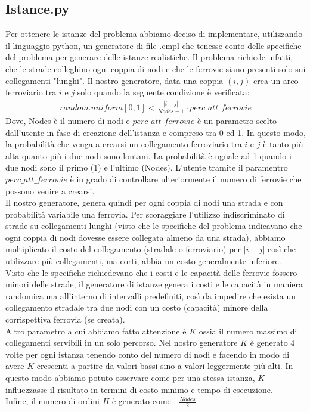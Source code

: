 \documentclass{article}
\begin{document}
\subsection{Istance.py}
Per ottenere le istanze del problema abbiamo deciso di implementare, utilizzando il linguaggio python, un generatore di file .cmpl che tenesse conto delle specifiche del problema per generare delle istanze realistiche. Il problema richiede infatti, che le strade colleghino ogni coppia di nodi e che le ferrovie siano presenti solo sui collegamenti "lunghi". Il nostro generatore, data una coppia $(i,j)$ crea un arco ferroviario tra $i$ e $j$ solo quando la seguente condizione è verificata:
\begin{align}
random.uniform[0,1] < \frac{|i -j|}{Nodes-1}\cdot perc\_att\_ferrovie
\end{align}
Dove, Nodes è il numero di nodi e $perc\_att\_ferrovie$ è un parametro scelto dall'utente in fase di creazione dell'istanza e compreso tra 0 ed 1. In questo modo, la probabilità che venga a crearsi un collegamento ferroviario tra $i$ e $j$ è tanto più alta quanto più i due nodi sono lontani. La probabilità è uguale ad 1 quando i due nodi sono il primo (1) e l'ultimo (Nodes). L'utente tramite il paramentro $perc\_att\_ferrovie$ è in grado di controllare ulteriormente il numero di ferrovie che possono venire a crearsi. 
\\
Il nostro generatore, genera quindi per ogni coppia di nodi una strada e con probabilità variabile una ferrovia. Per scoraggiare l'utilizzo indiscriminato di strade su collegamenti lunghi (visto che le specifiche del problema indicavano che ogni coppia di nodi dovesse essere collegata almeno da una strada), abbiamo moltiplicato il costo del collegamento (stradale o ferroviario) per $|i-j|$ così che utilizzare più collegamenti, ma corti, abbia un costo generalmente inferiore.
\\
Visto che le specifiche richiedevano che i costi e le capacità delle ferrovie fossero minori delle strade, il generatore di istanze genera i costi e le capacità in maniera randomica ma all'interno di intervalli predefiniti, così da impedire che esista un collegamento stradale tra due nodi con un costo (capacità) minore della corrispettiva ferrovia (se creata).
\\
Altro parametro a cui abbiamo fatto attenzione è $K$ ossia il numero massimo di collegamenti servibili in un solo percorso. Nel nostro generatore $K$ è generato 4 volte per ogni istanza tenendo conto del numero di nodi e facendo in modo di avere $K$ crescenti a partire da valori bassi sino a valori leggermente più alti. In questo modo abbiamo potuto osservare come per una stessa istanza, $K$ influezzasse il risultato in termini di costo minimo e tempo di esecuzione.
\\
Infine, il numero di ordini $H$ è generato come : $\frac{Nodes}{2}$
\end{document}
